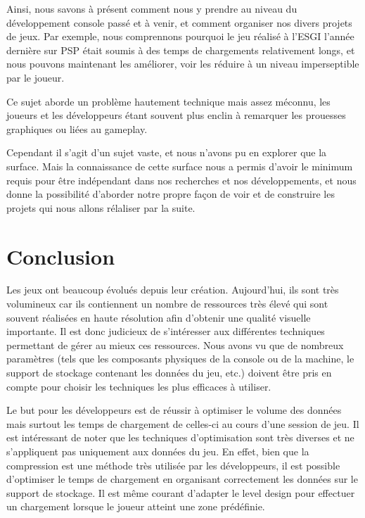 \documentclass[a4paper, 12pt]{article} %
\begin{document}
Ainsi, nous savons à présent comment nous y prendre au niveau du développement console passé et à venir, et comment organiser nos divers projets de jeux. Par exemple, nous comprennons pourquoi le jeu réalisé à l'ESGI l'année dernière sur PSP était soumis à des temps de chargements relativement longs, et nous pouvons maintenant les améliorer, voir les réduire à un niveau imperseptible par le joueur.

Ce sujet aborde un problème hautement technique mais assez méconnu, les joueurs et les développeurs étant souvent plus enclin à remarquer les prouesses graphiques ou liées au gameplay.

Cependant il s'agit d'un sujet vaste, et nous n'avons pu en explorer que la surface. Mais la connaissance de cette surface nous a permis d'avoir le minimum requis pour être indépendant dans nos recherches et nos développements, et nous donne la possibilité d'aborder notre propre façon de voir et de construire les projets qui nous allons rélaliser par la suite.


\newpage
\section{Conclusion}

Les jeux ont beaucoup évolués depuis leur création. Aujourd'hui, ils sont très volumineux car ils contiennent un nombre de ressources très élevé qui sont souvent réalisées en haute résolution afin d'obtenir une qualité visuelle importante. Il est donc judicieux de s'intéresser aux différentes techniques permettant de gérer au mieux ces ressources. Nous avons vu que de nombreux paramètres (tels que les composants physiques de la console ou de la machine, le support de stockage contenant les données du jeu, etc.) doivent être pris en compte pour choisir les techniques les plus efficaces à utiliser. 

Le but pour les développeurs est de réussir à optimiser le volume des données mais surtout les temps de chargement de celles-ci au cours d'une session de jeu. Il est intéressant de noter que les techniques d'optimisation sont très diverses et ne s'appliquent pas uniquement aux données du jeu. En effet, bien que la compression est une méthode très utilisée par les développeurs, il est possible d'optimiser le temps de chargement en organisant correctement les données sur le support de stockage. Il est même courant d'adapter le level design pour effectuer un chargement lorsque le joueur atteint une zone prédéfinie.
\end{document}
